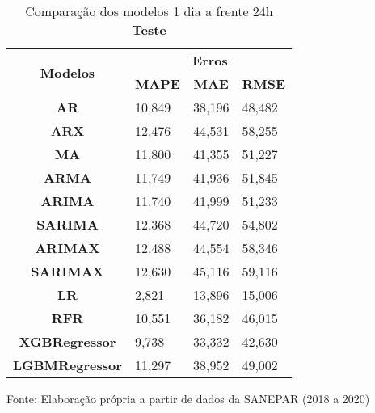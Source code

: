\begin{table}[H]
	\centering
	\caption{Comparação dos modelos 1 dia a frente 24h \textbf{Teste} }\label{tb:1-24tst}
	\begin{tabular}{@{}clll@{}}
		\toprule
		\multirow{2}{*}{\textbf{Modelos}} & \multicolumn{3}{c}{\textbf{Erros}}                                                                       \\ \cmidrule(l){2-4} 
		& \multicolumn{1}{c}{\textbf{MAPE}} & \multicolumn{1}{c}{\textbf{MAE}} & \multicolumn{1}{c}{\textbf{RMSE}} \\ \hline
\textbf{AR}                       & 10,849                            & 38,196                           & 48,482                            \\
\textbf{ARX}                      & 12,476                            & 44,531                           & 58,255                            \\
\textbf{MA}                       & 11,800                            & 41,355                           & 51,227                            \\
\textbf{ARMA}                     & 11,749                            & 41,936                           & 51,845                            \\
\textbf{ARIMA}                    & 11,740                            & 41,999                           & 51,233                            \\
\textbf{SARIMA}                   & 12,368                            & 44,720                           & 54,802                            \\
\textbf{ARIMAX}                   & 12,488                            & 44,554                           & 58,346                            \\
\textbf{SARIMAX}                  & 12,630                            & 45,116                           & 59,116                            \\
\textbf{LR}        & 2,821                             & 13,896                           & 15,006                            \\
\textbf{RFR}  & 10,551                            & 36,182                           & 46,015                            \\
\textbf{XGBRegressor}             & 9,738                             & 33,332                           & 42,630                            \\
\textbf{LGBMRegressor}            & 11,297                            & 38,952                           & 49,002                            \\ \bottomrule
	\end{tabular}

Fonte: Elaboração própria a partir de dados da SANEPAR (2018 a 2020)
\end{table}

